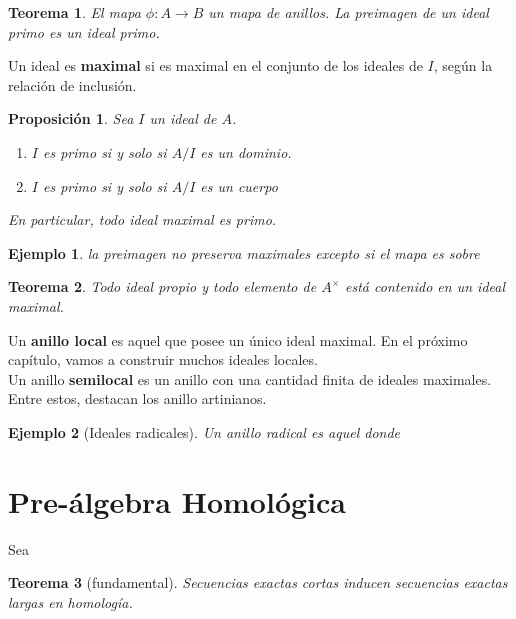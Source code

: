 \documentclass[12pt]{book}
\newtheorem{eje}{Ejemplo}
\newtheorem{teo}{Teorema}
\newtheorem{pro}{Proposición}
\begin{document}
\begin{teo}
	El mapa $\phi:A\rightarrow B$ un mapa de anillos. La preimagen de un ideal  primo es un ideal primo.
\end{teo}

Un ideal es \textbf{maximal} si es maximal en el conjunto de los ideales de $I$, según la relación de inclusión.
\begin{pro} Sea $I$ un ideal de $A$.
\begin{enumerate}
\item $I$ es primo si y solo si $A/I$ es un dominio.
\item $ I $ es primo si y solo si $A/I$ es un cuerpo
\end{enumerate}
En particular, todo ideal maximal es primo.
\end{pro}

\begin{eje}
la preimagen no preserva maximales excepto si el mapa es sobre
\end{eje}

\begin{teo}
Todo ideal propio y todo elemento de $A^{\times}$ está contenido en un ideal maximal.
\end{teo}





Un \textbf{anillo local} es aquel que posee un único ideal maximal. En el próximo capítulo, vamos a construir muchos ideales locales.\\
Un anillo \textbf{semilocal} es un anillo con una cantidad finita de ideales maximales. Entre estos, destacan los anillo artinianos.




\begin{eje}[Ideales radicales]
Un anillo radical es aquel donde 
\end{eje}




\section{Pre-álgebra Homológica}

Sea 

\begin{teo}[fundamental]
	Secuencias exactas cortas inducen secuencias exactas largas en homología.
\end{teo}
\end{document}
